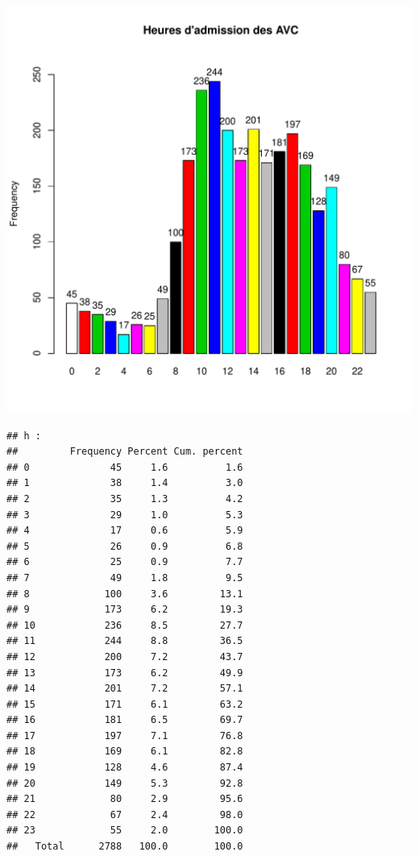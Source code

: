 \documentclass[12pt,english,french,twoside]{book}\usepackage[]{graphicx}\usepackage[]{color}
\makeatletter
\def\maxwidth{ %
  \ifdim\Gin@nat@width>\linewidth
    \linewidth
  \else
    \Gin@nat@width
  \fi
}
\newenvironment{kframe}{%
 \def\at@end@of@kframe{}%
 \ifinner\ifhmode%
  \def\at@end@of@kframe{\end{minipage}}%
  \begin{minipage}{\columnwidth}%
 \fi\fi%
 \def\FrameCommand##1{\hskip\@totalleftmargin \hskip-\fboxsep
 \colorbox{shadecolor}{##1}\hskip-\fboxsep
     \hskip-\linewidth \hskip-\@totalleftmargin \hskip\columnwidth}%
 \MakeFramed {\advance\hsize-\width
   \@totalleftmargin\z@ \linewidth\hsize
   \@setminipage}}%
 {\par\unskip\endMakeFramed%
 \at@end@of@kframe}
\newenvironment{knitrout}{}{} %
\makeatother
\begin{document}
\begin{knitrout}
\includegraphics[width=\maxwidth]{figure/heure_avc2} 
\begin{kframe}\begin{verbatim}
## h :  
##         Frequency Percent Cum. percent
## 0              45     1.6          1.6
## 1              38     1.4          3.0
## 2              35     1.3          4.2
## 3              29     1.0          5.3
## 4              17     0.6          5.9
## 5              26     0.9          6.8
## 6              25     0.9          7.7
## 7              49     1.8          9.5
## 8             100     3.6         13.1
## 9             173     6.2         19.3
## 10            236     8.5         27.7
## 11            244     8.8         36.5
## 12            200     7.2         43.7
## 13            173     6.2         49.9
## 14            201     7.2         57.1
## 15            171     6.1         63.2
## 16            181     6.5         69.7
## 17            197     7.1         76.8
## 18            169     6.1         82.8
## 19            128     4.6         87.4
## 20            149     5.3         92.8
## 21             80     2.9         95.6
## 22             67     2.4         98.0
## 23             55     2.0        100.0
##   Total      2788   100.0        100.0
\end{verbatim}
\end{kframe}
\end{knitrout}
\end{document}
